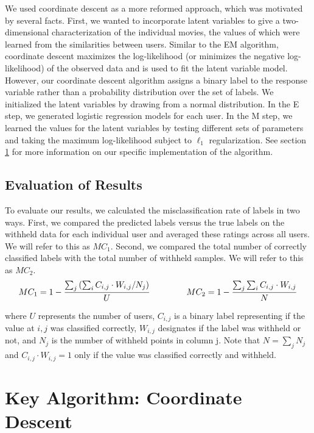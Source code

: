 \documentclass{article} %
\begin{document}
We used coordinate descent as a more reformed approach, which was motivated by several facts. First, we wanted to incorporate latent variables to give a two-dimensional characterization of the individual movies, the values of which were learned from the similarities between users. Similar to the EM algorithm, coordinate descent maximizes the log-likelihood (or minimizes the negative log-likelihood) of the observed data and is used to fit the latent variable model. However, our coordinate descent algorithm assigns a binary label to the response variable rather than a probability distribution over the set of labels. We initialized the latent variables by drawing from a normal distribution. In the E step, we generated logistic regression models for each user. In the M step, we learned the values for the latent variables by testing different sets of parameters and taking the maximum log-likelihood subject to $\ell_1$ regularization. See section \ref{cd} for more information on our specific implementation of the algorithm.

\subsection{Evaluation of Results}

To evaluate our results, we calculated the misclassification rate of labels in two ways. First, we compared the predicted labels versus the true labels on the withheld data for each individual user and averaged these ratings across all users. We will refer to this as $MC_1$. Second, we compared the total number of correctly classified labels with the total number of withheld samples. We will refer to this as $MC_2$.
\begin{align*}
MC_1 = 1 - \frac{\sum_j \left( \sum_i C_{i,j} \cdot W_{i,j} / N_j \right)}{U} \hspace{15mm}
MC_2 = 1 - \frac{\sum_j \sum_i C_{i,j} \cdot W_{i,j} }{N}
\end{align*}

where $U$ represents the number of users, $C_{i,j}$ is a binary label representing if the value at $i,j$ was classified correctly, $W_{i,j}$ designates if the label was withheld or not, and $N_j$ is the number of withheld points in column j. Note that $N=\sum_j N_j$ and $C_{i,j} \cdot W_{i,j} = 1$ only if the value was classified correctly and withheld.

\section{Key Algorithm: Coordinate Descent}\label{cd}
\end{document}
